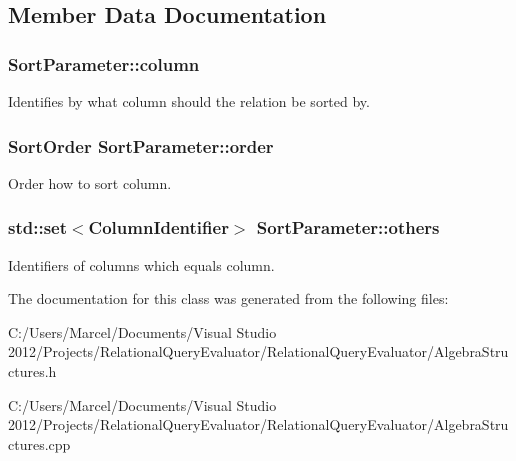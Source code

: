 \subsection{Member Data Documentation}
\hypertarget{class_sort_parameter_a663fa509158e2230256acb4cee4657b9}{
\subsubsection[{column}]{ Sort\+Parameter\+::column}}\label{class_sort_parameter_a663fa509158e2230256acb4cee4657b9}
Identifies by what column should the relation be sorted by. \hypertarget{class_sort_parameter_a768e8eeb0a9857820c1596ed50c0c13a}{
\subsubsection[{order}]{\setlength{\rightskip}{0pt plus 5cm}Sort\+Order Sort\+Parameter\+::order}}\label{class_sort_parameter_a768e8eeb0a9857820c1596ed50c0c13a}
Order how to sort column. \hypertarget{class_sort_parameter_ad898e5ea54ea4599db663b480af94cfd}{
\subsubsection[{others}]{\setlength{\rightskip}{0pt plus 5cm}std\+::set$<${\bf Column\+Identifier}$>$ Sort\+Parameter\+::others}}\label{class_sort_parameter_ad898e5ea54ea4599db663b480af94cfd}
Identifiers of columns which equals column. 

The documentation for this class was generated from the following files\+:\begin{DoxyCompactItemize}
\item 
C\+:/\+Users/\+Marcel/\+Documents/\+Visual Studio 2012/\+Projects/\+Relational\+Query\+Evaluator/\+Relational\+Query\+Evaluator/Algebra\+Structures.\+h\item 
C\+:/\+Users/\+Marcel/\+Documents/\+Visual Studio 2012/\+Projects/\+Relational\+Query\+Evaluator/\+Relational\+Query\+Evaluator/Algebra\+Structures.\+cpp\end{DoxyCompactItemize}
